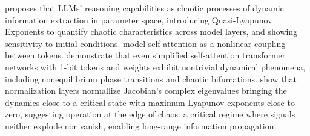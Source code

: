 \documentclass[a4paper,12pt]{article}
\begin{document}
\cite{li2025cognitive_activation} proposes that LLMs' reasoning capabilities as chaotic processes of dynamic information extraction in parameter space, introducing Quasi-Lyapunov Exponents to quantify chaotic characteristics across model layers, and showing sensitivity to initial conditions.
\cite{geshkovski2025mathematicalperspectivetransformers} model self-attention as a nonlinear coupling between tokens.
\cite{dynamicalmeanfieldtheoryselfattention} demonstrate that even simplified self-attention transformer networks with 1-bit tokens and weights exhibit nontrivial dynamical phenomena, including nonequilibrium phase transitions and chaotic bifurcations. 
\cite{tomihari2025recurrent_self_attention_dynamics} show that normalization layers normallize Jacobian's complex eigenvalues bringing the dynamics close to a critical state with maximum Lyapunov exponents close to zero, suggesting operation at the edge of chaos: a critical regime where signals neither explode nor vanish, enabling long-range information propagation. %
\end{document}
